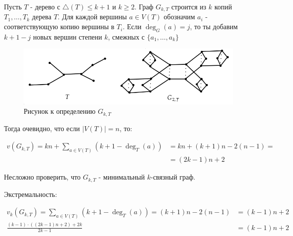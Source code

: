 \begin{df*}[$G_{k,T}$]
	Пусть $T$ - дерево с  $\triangle(T) \leqslant k + 1$ и $k \geqslant 2$.
	Граф $G_{k, T}$ строится из  $k$ копий  $T_1, \ldots, T_k$ дерева $T$.
	Для каждой вершины  $a \in V(T)$ обозначим  $a_i$ - соответствующую копию вершины в $T_i$.
	Если  $\deg_G(a) = j$, то ты добавим  $k + 1 - j$ новых вершин степени  $k$, смежных с  $\{a_1, \ldots, a_k\}$

\begin{figure}[ht]
    \centering
	\includegraphics[width=0.5\columnwidth]{figures/3_definition_g_k_t.png}
    \caption{Рисунок к определению $G_{k, T}$}
\end{figure}

	Тогда очевидно, что если $|V(T)| = n$, то:

	\begin{align*}
		v(G_{k, T}) = kn + \sum_{a \in V(T)} (k + 1 - \deg_T(a)) &= kn + (k + 1)n - 2 (n - 1) =\\
																&=(2k - 1)n + 2
	\end{align*}

	Несложно проверить, что  $G_{k, T}$ - минимальный $k$-связный граф. 

	Экстремальность:

	\begin{align*}
		v_k(G_{k, T}) = \sum_{a \in V(T)} (k + 1 - \deg_T(a)) = (k + 1)n - 2(n - 1) &= (k - 1)n + 2 \\
		\frac{(k - 1) \cdot ((2k - 1)n + 2) + 2k}{2k - 1} &= (k - 1) n + 2
	\end{align*}


\end{df*}



